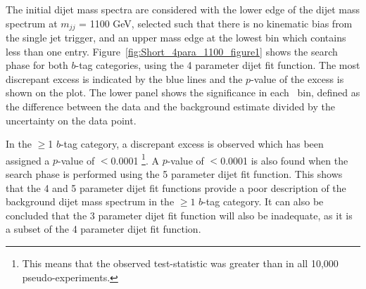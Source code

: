 The initial dijet mass spectra are considered with the lower edge of the dijet mass spectrum at $m_{jj}$ = 1100 GeV,
selected such that there is no kinematic bias from the single jet trigger,
and an upper mass edge at the lowest \mjj{} bin which contains less than one entry.
Figure~\ref{fig:Short_4para_1100_figure1} shows the search phase
for both $b$-tag categories, using the 4 parameter dijet fit function.
The most discrepant excess is indicated by the blue lines and the \bh{} \mbox{$p$-value} of the excess is shown on the plot.
The lower panel shows the significance in each~\mjj{} bin,
defined as the difference between the data and the background estimate divided by the uncertainty on the data point.

In the $\geq$1 $b$-tag category,
a discrepant excess is observed which has been assigned a \bh{} \mbox{$p$-value} of $<$0.0001
\footnote{This means that the observed \bh{} test-statistic was greater than in all 10,000 pseudo-experiments.}.
A \bh{} \mbox{$p$-value} of $<$0.0001 is also found when the search phase is performed using the 5 parameter dijet fit function.
This shows that the 4 and 5 parameter dijet fit functions provide a poor description
of the background dijet mass spectrum in the $\geq1$ $b$-tag category.
It can also be concluded that the 3 parameter dijet fit function will also be inadequate, as it is a subset of the 4 parameter dijet fit function.

